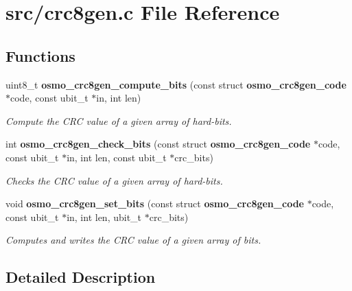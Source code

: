 \section{src/crc8gen.c File Reference}
\label{crc8gen_8c}
\subsection*{Functions}
\begin{DoxyCompactItemize}
\item 
uint8\_\-t {\bf osmo\_\-crc8gen\_\-compute\_\-bits} (const struct {\bf osmo\_\-crc8gen\_\-code} $\ast$code, const ubit\_\-t $\ast$in, int len)
\begin{DoxyCompactList}\small\item\em Compute the CRC value of a given array of hard-\/bits. \item\end{DoxyCompactList}\item 
int {\bf osmo\_\-crc8gen\_\-check\_\-bits} (const struct {\bf osmo\_\-crc8gen\_\-code} $\ast$code, const ubit\_\-t $\ast$in, int len, const ubit\_\-t $\ast$crc\_\-bits)
\begin{DoxyCompactList}\small\item\em Checks the CRC value of a given array of hard-\/bits. \item\end{DoxyCompactList}\item 
void {\bf osmo\_\-crc8gen\_\-set\_\-bits} (const struct {\bf osmo\_\-crc8gen\_\-code} $\ast$code, const ubit\_\-t $\ast$in, int len, ubit\_\-t $\ast$crc\_\-bits)
\begin{DoxyCompactList}\small\item\em Computes and writes the CRC value of a given array of bits. \item\end{DoxyCompactList}\end{DoxyCompactItemize}


\subsection{Detailed Description}

